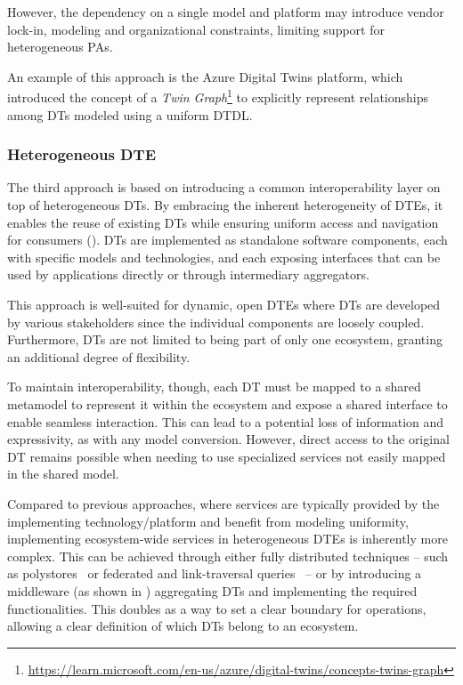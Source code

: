 However, the dependency on a single model and platform may introduce vendor lock-in, modeling and organizational constraints, limiting support for heterogeneous \acp{PA}.

An example of this approach is the Azure Digital Twins platform, which introduced the concept of a \emph{Twin Graph}\footnote{\url{https://learn.microsoft.com/en-us/azure/digital-twins/concepts-twins-graph}} to explicitly represent relationships among \acp{DT} modeled using a uniform \ac{DTDL}.


\subsubsection{Heterogeneous \acl{DTE}}
\label{sssec:heterogeneous}

The third approach is based on introducing a common interoperability layer on top of heterogeneous \acp{DT}.
%
By embracing the inherent heterogeneity of \acp{DTE}, it enables the reuse of existing \acp{DT} while ensuring uniform access and navigation for consumers ().
%
\acp{DT} are implemented as standalone software components, each with specific models and technologies, and each exposing interfaces that can be used by applications directly or through intermediary aggregators.

This approach is well-suited for dynamic, open \acp{DTE} where \acp{DT} are developed by various stakeholders since the individual components are loosely coupled.
%
Furthermore, \acp{DT} are not limited to being part of only one ecosystem, granting an additional degree of flexibility.

To maintain interoperability, though, each \ac{DT} must be mapped to a shared metamodel to represent it within the ecosystem and expose a shared interface to enable seamless interaction.
This can lead to a potential loss of information and expressivity, as with any model conversion.
However, direct access to the original \ac{DT} remains possible when needing to use specialized services not easily mapped in the shared model.

Compared to previous approaches, where services are typically provided by the implementing technology/platform and benefit from modeling uniformity, implementing ecosystem-wide services in heterogeneous \acp{DTE} is inherently more complex.
%
This can be achieved through either fully distributed techniques
-- such as polystores~\cite{dggan2015polystore} or federated and link-traversal queries~\cite{schwarte2011semweb,quilitz2008querydistributed,bogaerts2021linktraversalquery} --
or by introducing a middleware (as shown in ) aggregating \acp{DT} and implementing the required functionalities.
%
This doubles as a way to set a clear boundary for operations, allowing a clear definition of which \acp{DT} belong to an ecosystem.

